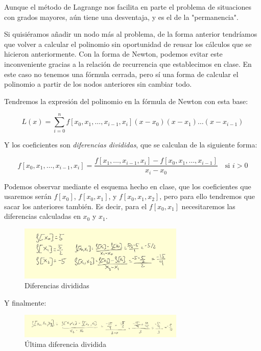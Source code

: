 \documentclass{article}
\begin{document}
Aunque el método de Lagrange nos facilita en parte el problema de situaciones con grados mayores, aún tiene una desventaja, y es el de la "permanencia".

Si quisiéramos añadir un nodo más al problema, de la forma anterior tendríamos que volver a calcular el polinomio sin oportunidad de reusar los cálculos que se hicieron anteriormente. Con la forma de Newton, podemos evitar este inconveniente gracias a la relación de recurrencia que establecimos en clase. En este caso no tenemos una fórmula cerrada, pero sí una forma de calcular el polinomio a partir de los nodos anteriores sin cambiar todo.

Tendremos la expresión del polinomio en la fórmula de Newton con esta base:

\begin{equation}
L(x) = \sum_{i=0}^{n} f[x_0, x_1, \dots, x_{i-1}, x_i](x - x_0)(x - x_1) \dots (x - x_{i-1})
\end{equation}

Y los coeficientes son \textit{diferencias divididas}, que se calculan de la siguiente forma:

\begin{equation}
f[x_0, x_1, \dots, x_{i-1}, x_i] = \frac{f[x_1, \dots, x_{i-1}, x_i] - f[x_0, x_1, \dots, x_{i-1}]}{x_i - x_0} \quad \text{si } i > 0 
\end{equation}

Podemos observar mediante el esquema hecho en clase, que los coeficientes que usaremos serán $f[x_0]$, $f[x_0,x_1]$, y $f[x_0, x_1, x_2]$, pero para ello tendremos que sacar los anteriores también. Es decir, para el $f[x_0, x_1]$ necesitaremos las diferencias calculadas en $x_0$ y $x_1$.

\begin{figure}[h]
  \center
  \includegraphics[width=0.7\textwidth]{src/fxnewton.jpg}
  \caption{Diferencias divididas}
\end{figure}

Y finalmente:

\begin{figure}[h]
  \center
  \includegraphics[width=0.7\textwidth]{src/f012newton.jpg}
  \caption{Última diferencia dividida}
\end{figure}
\end{document}
